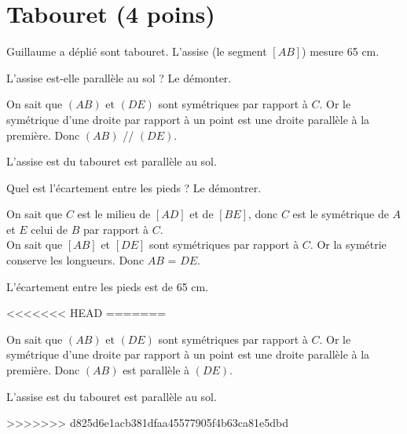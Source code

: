 \section{Tabouret (4 poins)}

\begin{multicols}{2}
	Guillaume a déplié sont tabouret. L'assise (le segment $[AB]$) mesure 65 cm.

\begin{questions}
	
	\question[2] L'assise est-elle parallèle au sol ? Le démonter.
	
	\begin{solution}
		On sait que $(AB)$ et $(DE)$ sont symétriques par rapport à $C$.
		Or le symétrique d'une droite par rapport à un point est une droite parallèle à la première.
		Donc $(AB)$ // $(DE)$.
		
		L'assise est du tabouret est parallèle au sol.
	\end{solution}

	\question[2] Quel est l'écartement entre les pieds ? Le démontrer.
	\begin{solution}
		On sait que $C$ est le milieu de $[AD]$ et de $[BE]$, donc $C$ est le symétrique de $A$ et $E$ celui de $B$ par rapport à $C$.\\
		
		On sait que $[AB]$ et $[DE]$ sont symétriques par rapport à $C$.
		Or la symétrie conserve les longueurs.
		Donc $AB$ = $DE$.
		
		L'écartement entre les pieds est de 65 cm.
		
	\end{solution}
	
	
<<<<<<< HEAD
=======
	\begin{solution}
		On sait que $(AB)$ et $(DE)$ sont symétriques par rapport à $C$.
		Or le symétrique d'une droite par rapport à un point est une droite parallèle à la première.
		Donc $(AB)$ est parallèle à $(DE)$.
		
		L'assise est du tabouret est parallèle au sol.
	\end{solution}
>>>>>>> d825d6e1acb381dfaa45577905f4b63ca81e5dbd
\end{questions}


\end{multicols}

